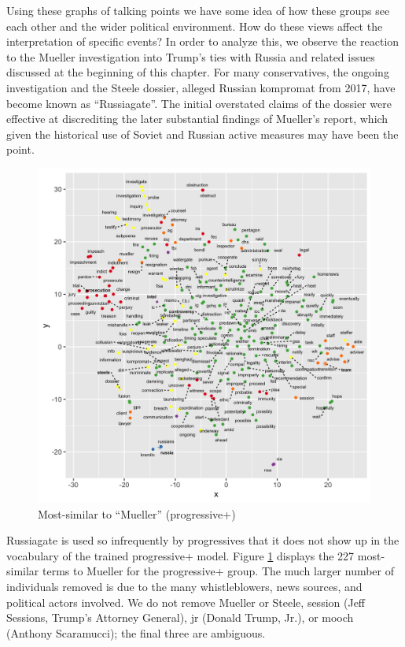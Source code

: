 \documentclass[doublespacing]{utdthesis}
\begin{document}
Using these graphs of talking points we have some idea of how these groups see each other and the wider political environment.
How do these views affect the interpretation of specific events?
In order to analyze this, we observe the reaction to the Mueller investigation into Trump's ties with Russia and related issues discussed at the beginning of this chapter.
For many conservatives, the ongoing investigation and the Steele dossier, alleged Russian kompromat from 2017, have become known as ``Russiagate''.
The initial overstated claims of the dossier were effective at discrediting the later substantial findings of Mueller's report, which given the historical use of Soviet and Russian active measures may have been the point.

\begin{figure}[!ht]
\centering
\includegraphics[width=\textwidth]{2016/prog_plus_mueller}
\caption{Most-similar to ``Mueller'' (progressive+)}
\label{fig:prog_plus_mueller}
\end{figure}

Russiagate is used so infrequently by progressives that it does not show up in the vocabulary of the trained progressive+ model.
Figure \ref{fig:prog_plus_mueller} displays the 227 most-similar terms to Mueller for the progressive+ group.
The much larger number of individuals removed is due to the many whistleblowers, news sources, and political actors involved.
We do not remove Mueller or Steele, session (Jeff Sessions, Trump's Attorney General), jr (Donald Trump, Jr.), or mooch (Anthony Scaramucci); the final three are ambiguous.
\end{document}
